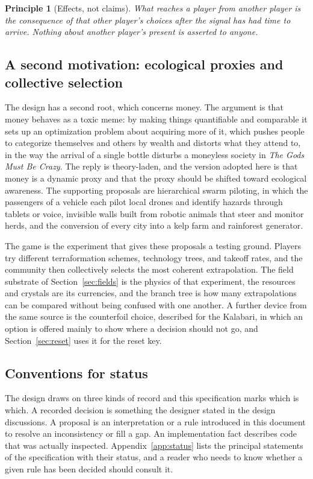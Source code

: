 \documentclass[11pt]{article}
\newtheorem{principle}{Principle}
\begin{document}
\begin{principle}[Effects, not claims]
What reaches a player from another player is the consequence of that other player's choices after the signal has had time to arrive. Nothing about another player's present is asserted to anyone.
\end{principle}

\subsection{A second motivation: ecological proxies and collective selection}

The design has a second root, which concerns money. The argument is that money behaves as a toxic meme: by making things quantifiable and comparable it sets up an optimization problem about acquiring more of it, which pushes people to categorize themselves and others by wealth and distorts what they attend to, in the way the arrival of a single bottle disturbs a moneyless society in \emph{The Gods Must Be Crazy}. The reply is theory-laden, and the version adopted here is that money is a dynamic proxy and that the proxy should be shifted toward ecological awareness. The supporting proposals are hierarchical swarm piloting, in which the passengers of a vehicle each pilot local drones and identify hazards through tablets or voice, invisible walls built from robotic animals that steer and monitor herds, and the conversion of every city into a kelp farm and rainforest generator.

The game is the experiment that gives these proposals a testing ground. Players try different terraformation schemes, technology trees, and takeoff rates, and the community then collectively selects the most coherent extrapolation. The field substrate of Section~\ref{sec:fields} is the physics of that experiment, the resources and crystals are its currencies, and the branch tree is how many extrapolations can be compared without being confused with one another. A further device from the same source is the counterfoil choice, described for the Kalabari, in which an option is offered mainly to show where a decision should not go, and Section~\ref{sec:reset} uses it for the reset key.

\subsection{Conventions for status}

The design draws on three kinds of record and this specification marks which is which. A recorded decision is something the designer stated in the design discussions. A proposal is an interpretation or a rule introduced in this document to resolve an inconsistency or fill a gap. An implementation fact describes code that was actually inspected. Appendix~\ref{app:status} lists the principal statements of the specification with their status, and a reader who needs to know whether a given rule has been decided should consult it.
\end{document}
